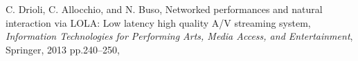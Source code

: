 C. Drioli, C. Allocchio, and N. Buso,
  Networked performances and natural interaction via LOLA: Low latency high quality A/V streaming system,
  \emph{Information Technologies for Performing Arts, Media Access, and Entertainment}, Springer, 2013
  pp.240--250,


%	
%	
%	
%	
%	
%	
%	
